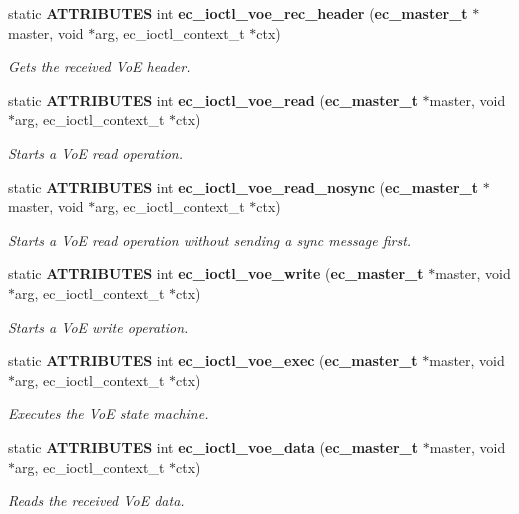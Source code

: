 \begin{DoxyCompactItemize}
static {\bf \-A\-T\-T\-R\-I\-B\-U\-T\-E\-S} int {\bf ec\-\_\-ioctl\-\_\-voe\-\_\-rec\-\_\-header} ({\bf ec\-\_\-master\-\_\-t} $\ast$master, void $\ast$arg, ec\-\_\-ioctl\-\_\-context\-\_\-t $\ast$ctx)
\begin{DoxyCompactList}\small\item\em \-Gets the received \-Vo\-E header. \end{DoxyCompactList}\item 
static {\bf \-A\-T\-T\-R\-I\-B\-U\-T\-E\-S} int {\bf ec\-\_\-ioctl\-\_\-voe\-\_\-read} ({\bf ec\-\_\-master\-\_\-t} $\ast$master, void $\ast$arg, ec\-\_\-ioctl\-\_\-context\-\_\-t $\ast$ctx)
\begin{DoxyCompactList}\small\item\em \-Starts a \-Vo\-E read operation. \end{DoxyCompactList}\item 
static {\bf \-A\-T\-T\-R\-I\-B\-U\-T\-E\-S} int {\bf ec\-\_\-ioctl\-\_\-voe\-\_\-read\-\_\-nosync} ({\bf ec\-\_\-master\-\_\-t} $\ast$master, void $\ast$arg, ec\-\_\-ioctl\-\_\-context\-\_\-t $\ast$ctx)
\begin{DoxyCompactList}\small\item\em \-Starts a \-Vo\-E read operation without sending a sync message first. \end{DoxyCompactList}\item 
static {\bf \-A\-T\-T\-R\-I\-B\-U\-T\-E\-S} int {\bf ec\-\_\-ioctl\-\_\-voe\-\_\-write} ({\bf ec\-\_\-master\-\_\-t} $\ast$master, void $\ast$arg, ec\-\_\-ioctl\-\_\-context\-\_\-t $\ast$ctx)
\begin{DoxyCompactList}\small\item\em \-Starts a \-Vo\-E write operation. \end{DoxyCompactList}\item 
static {\bf \-A\-T\-T\-R\-I\-B\-U\-T\-E\-S} int {\bf ec\-\_\-ioctl\-\_\-voe\-\_\-exec} ({\bf ec\-\_\-master\-\_\-t} $\ast$master, void $\ast$arg, ec\-\_\-ioctl\-\_\-context\-\_\-t $\ast$ctx)
\begin{DoxyCompactList}\small\item\em \-Executes the \-Vo\-E state machine. \end{DoxyCompactList}\item 
static {\bf \-A\-T\-T\-R\-I\-B\-U\-T\-E\-S} int {\bf ec\-\_\-ioctl\-\_\-voe\-\_\-data} ({\bf ec\-\_\-master\-\_\-t} $\ast$master, void $\ast$arg, ec\-\_\-ioctl\-\_\-context\-\_\-t $\ast$ctx)
\begin{DoxyCompactList}\small\item\em \-Reads the received \-Vo\-E data. \end{DoxyCompactList}\item 

\end{DoxyCompactItemize}
